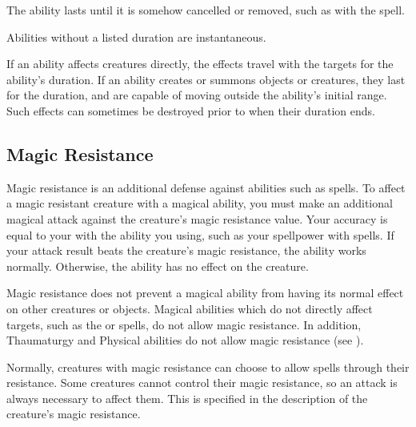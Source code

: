          The ability lasts until it is somehow cancelled or removed, such as with the  spell.

         Abilities without a listed duration are instantaneous.

         If an ability affects creatures directly, the effects travel with the targets for the ability's duration.
        If an ability creates or summons objects or creatures, they last for the duration, and are capable of moving outside the ability's initial range.
        Such effects can sometimes be destroyed prior to when their duration ends.



    \subsection{Magic Resistance}\label{Magic Resistance}
        Magic resistance is an additional defense against  abilities such as spells.
        To affect a magic resistant creature with a magical ability, you must make an additional magical attack against the creature's magic resistance value.
        Your accuracy is equal to your  with the ability you using, such as your spellpower with spells.
        If your attack result beats the creature's magic resistance, the ability works normally.
        Otherwise, the ability has no effect on the creature.

        Magic resistance does not prevent a magical ability from having its normal effect on other creatures or objects.
        Magical abilities which do not directly affect targets, such as the  or  spells, do not allow magic resistance.
        In addition, Thaumaturgy and Physical abilities do not allow magic resistance (see ).

        Normally, creatures with magic resistance can choose to allow spells through their resistance.
        Some creatures cannot control their magic resistance, so an attack is always necessary to affect them.
        This is specified in the description of the creature's magic resistance.

